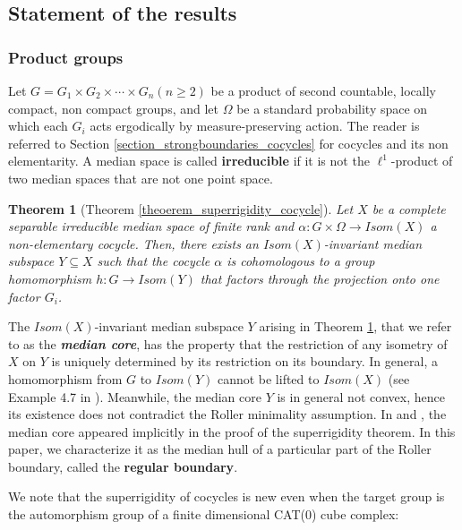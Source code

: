 \documentclass{amsart}
\numberwithin{equation}{section}
\newtheorem{theorem}{Theorem}
\theoremstyle{definition}
\begin{document}
 

\subsection{Statement of the results}
\subsubsection{Product groups}
Let $G=G_1\times G_2 \times \cdots \times G_n (n \geq 2)$ be a product of second countable, locally compact, non compact groups, and let $\Omega$ be a standard probability space on which each $G_i$ acts ergodically by measure-preserving action. The reader is referred to Section \ref{section_strongboundaries_cocycles} for cocycles and its non elementarity. A median space is called \textbf{irreducible} if it is not the $\ell^1$-product of two median spaces that are not one point space.
 \begin{theorem}[Theorem \ref{theoerem_superrigidity_cocycle}]\label{thm_intro_cocycles}
 Let $X$ be a complete separable irreducible median space of finite rank and $\alpha:G\times \Omega \rightarrow Isom(X)$ a non-elementary cocycle. 
 Then, there exists an $Isom(X)$-invariant median subspace $Y\subseteq X$ such that the cocycle $\alpha$ is cohomologous to a group homomorphism $h:G\rightarrow Isom(Y)$ that factors through the projection onto one factor $G_i$.
 \end{theorem}\par 
The $Isom(X)$-invariant median subspace $Y$ arising in Theorem \ref{thm_intro_cocycles}, that we refer to as the \textbf{\textit{median core}}, has the property that the restriction of any isometry of $X$ on $Y$ is uniquely determined by its restriction on its boundary. In general, a homomorphism from $G$ to $Isom(Y)$ cannot be lifted to $Isom(X)$ (see Example 4.7 in \cite{Fior_superrigidity}). Meanwhile, the median core $Y$ is in general not convex, hence its existence does not contradict the Roller minimality assumption. In \cite{ChaIF} and \cite{Fior_superrigidity}, the median core appeared implicitly in the proof of the superrigidity theorem. In this paper, we characterize it as the median hull of a particular part of the Roller boundary, called the \textbf{regular boundary}. \par
 
 We note that the superrigidity of cocycles is new even when the target group is the automorphism group of a finite dimensional CAT(0) cube complex:\par 
\end{document}
